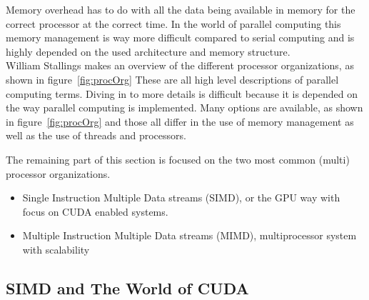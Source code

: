 Memory overhead has to do with all the data being available in memory for the correct processor at the correct time.
In the world of parallel computing this memory management is way more difficult compared to serial computing and is highly depended on the used architecture and memory structure.\\
William Stallings makes an overview of the different processor organizations, as shown in figure~\ref{fig:procOrg}
These are all high level descriptions of parallel computing terms.
Diving in to more details is difficult because it is depended on the way parallel computing is implemented.
Many options are available, as shown in figure~\ref{fig:procOrg} and those all differ in the use of memory management as well as the use of threads and processors.
\par 
The remaining part of this section is focused on the two most common (multi) processor organizations. 
\begin{itemize}
	\item Single Instruction Multiple Data streams (SIMD), or the GPU way with focus on CUDA enabled systems.
	\item Multiple Instruction Multiple Data streams (MIMD), multiprocessor system with scalability 
\end{itemize}
\subsection{SIMD and The World of CUDA}
